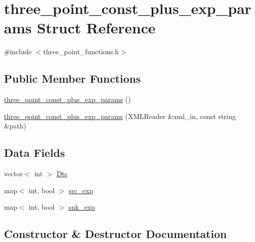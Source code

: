 \hypertarget{structthree__point__const__plus__exp__params}{}\section{three\+\_\+point\+\_\+const\+\_\+plus\+\_\+exp\+\_\+params Struct Reference}
\label{structthree__point__const__plus__exp__params}


{\ttfamily \#include $<$three\+\_\+point\+\_\+functions.\+h$>$}

\subsection*{Public Member Functions}
\begin{DoxyCompactItemize}
\item 
\mbox{\hyperlink{structthree__point__const__plus__exp__params_ae6650773d98cc9b6366d5c80c25f731b}{three\+\_\+point\+\_\+const\+\_\+plus\+\_\+exp\+\_\+params}} ()
\item 
\mbox{\hyperlink{structthree__point__const__plus__exp__params_a0d692445e74a2dc96a6c48983270da81}{three\+\_\+point\+\_\+const\+\_\+plus\+\_\+exp\+\_\+params}} (X\+M\+L\+Reader \&xml\+\_\+in, const string \&path)
\end{DoxyCompactItemize}
\subsection*{Data Fields}
\begin{DoxyCompactItemize}
\item 
vector$<$ int $>$ \mbox{\hyperlink{structthree__point__const__plus__exp__params_a83d585a244f59d6cd018e26aefc4881d}{Dts}}
\item 
map$<$ int, bool $>$ \mbox{\hyperlink{structthree__point__const__plus__exp__params_ab7455481b4af8b3298f723ff2b176c63}{src\+\_\+exp}}
\item 
map$<$ int, bool $>$ \mbox{\hyperlink{structthree__point__const__plus__exp__params_a229df803cee3065e6bae76b520da8a3a}{snk\+\_\+exp}}
\end{DoxyCompactItemize}


\subsection{Constructor \& Destructor Documentation}
\mbox{\label{structthree__point__const__plus__exp__params_ae6650773d98cc9b6366d5c80c25f731b}} 
